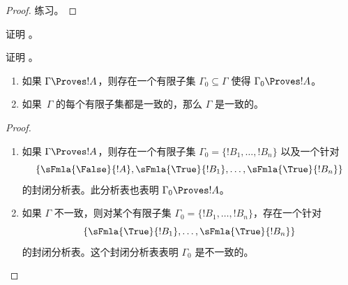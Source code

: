 \documentclass[../../../include/open-logic-section]{subfiles}
\begin{document}
\begin{proof}
练习。
\end{proof}

\begin{prob}
证明 。
\end{prob}
\tagendprob

\begin{prob}
证明 。
\end{prob}
\tagendprob

\begin{prop}[紧致性]
  \begin{enumerate}
  \item 如果 $\Gamma \Proves !A$，则存在一个有限子集 $\Gamma_0 \subseteq \Gamma$ 使得 $\Gamma_0 \Proves !A$。
  \item 如果~$\Gamma$ 的每个有限子集都是一致的，那么 $\Gamma$ 是一致的。
  \end{enumerate}
\end{prop}

\begin{proof}
  \begin{enumerate}
    \item 如果 $\Gamma \Proves !A$，则存在一个有限子集 $\Gamma_0 = \{!B_1, \dots, !B_n\}$ 以及一个针对
      \[
      \{\sFmla{\False}{!A}, \sFmla{\True}{!B_1}, \dots, \sFmla{\True}{!B_n}\}
      \]
      的封闭分析表。此分析表也表明 $\Gamma_0 \Proves !A$。
    \item 如果 $\Gamma$ 不一致，则对某个有限子集
      $\Gamma_0 = \{!B_1, \dots, !B_n\}$，存在一个针对
      \[
      \{\sFmla{\True}{!B_1}, \dots, \sFmla{\True}{!B_n}\}
      \]
      的封闭分析表。这个封闭分析表表明 $\Gamma_0$ 是不一致的。
  \end{enumerate}
\end{proof}
\end{document}

